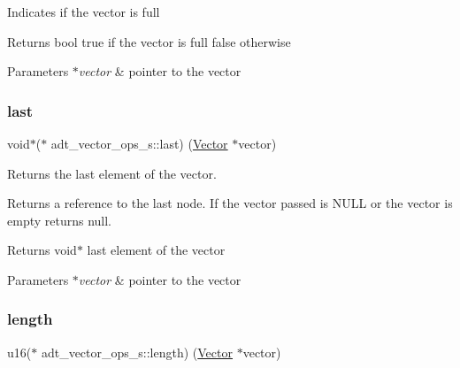 Indicates if the vector is full

\begin{DoxyReturn}{Returns}
bool true if the vector is full false otherwise 
\end{DoxyReturn}

\begin{DoxyParams}{Parameters}
{\em $\ast$vector} & pointer to the vector \\
\hline
\end{DoxyParams}
\mbox{\label{structadt__vector__ops__s_a92f62f43524774eb0cf9d94a2dd39056}} 
\subsubsection{\texorpdfstring{last}{last}}
{\footnotesize\ttfamily void$\ast$($\ast$ adt\+\_\+vector\+\_\+ops\+\_\+s\+::last) (\hyperlink{structadt__vector__s}{Vector} $\ast$vector)}



Returns the last element of the vector. 

Returns a reference to the last node. If the vector passed is N\+U\+LL or the vector is empty returns null.

\begin{DoxyReturn}{Returns}
void$\ast$ last element of the vector 
\end{DoxyReturn}

\begin{DoxyParams}{Parameters}
{\em $\ast$vector} & pointer to the vector \\
\hline
\end{DoxyParams}
\mbox{\label{structadt__vector__ops__s_aa859e768f4bff7e2d153243287a2a42f}} 
\subsubsection{\texorpdfstring{length}{length}}
{\footnotesize\ttfamily u16($\ast$ adt\+\_\+vector\+\_\+ops\+\_\+s\+::length) (\hyperlink{structadt__vector__s}{Vector} $\ast$vector)}



